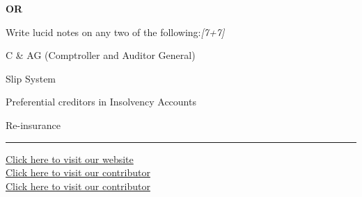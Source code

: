 \documentclass[11pt,a4paper]{article}
\newcommand{\pts}[1]{\hfill   \textit{[#1]}}
\begin{document}
\centerline{   \textbf{OR}}

Write lucid notes on any two of the following:\pts{7+7}

\begin{parts}
  \item C \& AG (Comptroller and Auditor General)
  \item Slip System
  \item Preferential creditors in Insolvency Accounts
  \item Re-insurance
\end{parts}

\vfill
\rule{\linewidth}{0.4pt}

\begin{center}\small
  \href{https://bhu-exam.vercel.app/}{Click here to visit our website}\\[4pt]
  \href{https://me-aryan.vercel.app/}{Click here to visit our contributor}\\[4pt]
  \href{https://quashan-me.vercel.app/}{Click here to visit our contributor}
\end{center}
\end{document}
